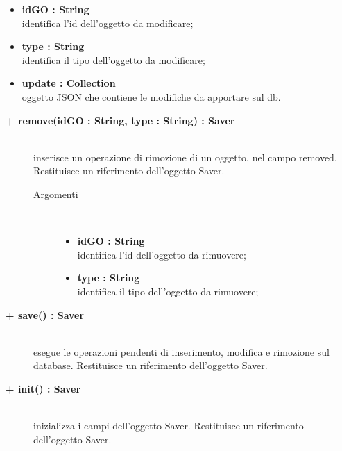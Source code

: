 \begin{description}
\begin{description}
\begin{description}
\begin{itemize}
					\item \textbf{idGO : String			} \hfill \\
					identifica l'id dell'oggetto da modificare;
					\item \textbf{type : String			} \hfill \\
					identifica il tipo dell'oggetto da modificare;
					\item \textbf{update : Collection			} \hfill \\
					oggetto JSON che contiene le modifiche da apportare sul db. 
				\end{itemize}
		\end{description}
	\end{description}

	\begin{description}
		\item[\textbf{\color{blue}+ remove(idGO : String, type : String) : Saver			}] \hfill \\
			inserisce un operazione di rimozione di un oggetto, nel campo removed. Restituisce un riferimento dell'oggetto Saver.
			
		\begin{description}
			\item[Argomenti] \hfill \\
				\begin{itemize}
				
					\item \textbf{idGO : String			} \hfill \\
					identifica l'id dell'oggetto da rimuovere;
					\item \textbf{type : String			} \hfill \\
					identifica il tipo dell'oggetto da rimuovere;
				\end{itemize}
		\end{description}
	\end{description}
	
		\begin{description}
		\item[\textbf{\color{blue}+ save() : Saver			}] \hfill \\
			esegue le operazioni pendenti di inserimento, modifica e rimozione sul database. Restituisce un riferimento dell'oggetto Saver.
		\end{description}

		\begin{description}
		\item[\textbf{\color{blue}+ init() : Saver			}] \hfill \\
			inizializza i campi dell'oggetto Saver. Restituisce un riferimento dell'oggetto Saver.
		\end{description}	
	
\end{description}


